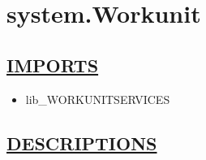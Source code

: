 \chapter*{system.Workunit}
\hypertarget{ecldoc:toc:system.Workunit}{}

\section*{\underline{IMPORTS}}
\begin{itemize}
\item lib\_WORKUNITSERVICES
\end{itemize}

\section*{\underline{DESCRIPTIONS}}
